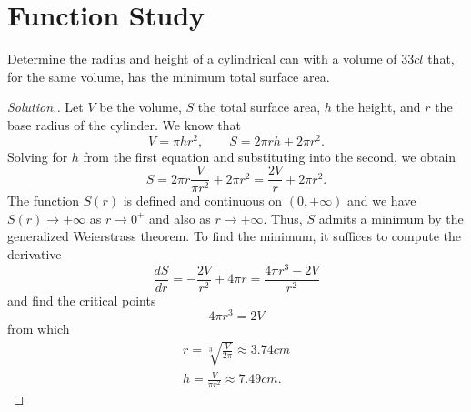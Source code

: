 \section{Function Study}

\begin{exercise}
%
%
Determine the radius and height of a cylindrical can with a volume of $33 cl$
that, for the same volume, has the minimum total surface area.
\end{exercise}
\begin{proof}[Solution.]
Let $V$ be the volume, $S$ the total surface area, $h$ the height, and $r$ the
base radius of the cylinder. We know that
\[
  V = \pi h r^2, \qquad
  S = 2\pi r h + 2 \pi r^2.
\]
Solving for $h$ from the first equation and substituting into the second, we
obtain
\[
  S = 2 \pi r \frac{V}{\pi r^2} + 2 \pi r^2
    = \frac{2V}{r} + 2 \pi r^2.
\]
The function $S(r)$ is defined and continuous on $(0,+\infty)$ and we have
$S(r)\to +\infty$ as $r\to 0^+$ and also as $r\to +\infty$. Thus, $S$ admits a
minimum by the generalized Weierstrass theorem. To find the minimum, it suffices
to compute the derivative
\[
 \frac{dS}{dr} = -\frac{2V}{r^2} + 4 \pi r = \frac{4\pi r^3 - 2V}{r^2}
\]
and find the critical points
\[
  4\pi r^3 = 2V
\]
from which
\begin{align*}
 r = \sqrt[3]{\frac{V}{2\pi}} \approx 3.74 cm\\
 h = \frac{V}{\pi r^2} \approx 7.49 cm.
\end{align*}
\end{proof}


